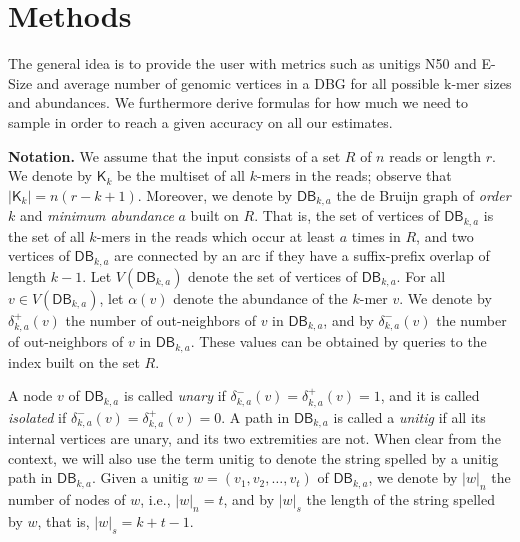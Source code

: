 \documentclass[a4paper,11pt]{article}
\newcommand{\kristoffer}[1]{{\color{red}{#1}}}
\newcommand{\alex}[1]{{\color{blue}{#1}}}
\newcommand{\DB}{\mathsf{DB}_{k,a}}
\newcommand{\dplus}{\delta^+_{k,a}}
\newcommand{\dminus}{\delta^-_{k,a}}
\newcommand{\K}{\mathsf{K}}
\newcommand{\abu}{\alpha}
\begin{document}
\section{Methods} %
\label{sec:methods}

The general idea is to provide the user with metrics such as unitigs N50 and E-Size and average number of genomic vertices in a DBG  for all possible k-mer sizes and abundances. \kristoffer{ We implement a FM-index data structure described in cite XX. This allows us to query a k-mer, its in and out neighbors in O() time. }  We furthermore derive formulas for how much we need to sample in order to reach a given accuracy on all our estimates. 

\noindent \textbf{Notation.} We assume that the input consists of a set $R$ of $n$ reads or length $r$. We denote by $\K_k$ be the multiset of all $k$-mers in the reads; observe that $|\K_k| = n(r-k+1)$. Moreover, we denote by $\DB$ the de Bruijn graph of \emph{order} $k$ and \emph{minimum abundance} $a$ built on $R$. That is, the set of vertices of $\DB$ is the set of all $k$-mers in the reads which occur at least $a$ times in $R$, and two vertices of $\DB$ are connected by an arc if they have a suffix-prefix overlap of length $k-1$. Let $V(\DB)$ denote the set of vertices of $\DB$. For all $v \in V(\DB)$, let $\abu(v)$ denote the abundance of the $k$-mer $v$. We denote by $\dplus(v)$ the number of out-neighbors of $v$ in $\DB$, and by $\dminus(v)$ the number of out-neighbors of $v$ in $\DB$. These values can be obtained by queries to the index built on the set $R$. 

A node $v$ of $\DB$ is called \emph{unary} if $\dminus(v) = \dplus(v) = 1$, and it is called \emph{isolated} if $\dminus(v) = \dplus(v) = 0$. A path in $\DB$ is called a \emph{unitig} if all its internal vertices are unary, and its two extremities are not. When clear from the context, we will also use the term unitig to denote the string spelled by a unitig path in $\DB$. Given a unitig $w = (v_1,v_2,\dots,v_t)$ of $\DB$, we denote by $|w|_n$ the number of nodes of $w$, i.e., $|w|_n = t$, and by $|w|_s$ the length of the string spelled by $w$, that is, $|w|_s = k + t - 1$.

\alex{Talk about reverse complements in dB graphs: a k-mer and its reverse complement are bundled into the same node and the abundances are added up. Say how we deal with this case in practice.}

\alex{Give pseudo-code of how we get the in/out degrees for all abundances.}
\end{document}
